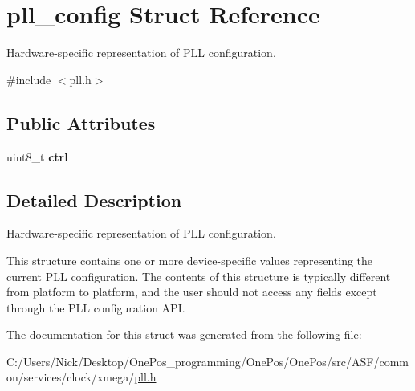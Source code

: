 \hypertarget{structpll__config}{\section{pll\-\_\-config Struct Reference}
\label{structpll__config}
}


Hardware-\/specific representation of P\-L\-L configuration.  




{\ttfamily \#include $<$pll.\-h$>$}

\subsection*{Public Attributes}
\begin{DoxyCompactItemize}
\item 
\hypertarget{structpll__config_a3fda0884562a8a2aa6056c0530b0a401}{uint8\-\_\-t {\bfseries ctrl}}\label{structpll__config_a3fda0884562a8a2aa6056c0530b0a401}

\end{DoxyCompactItemize}


\subsection{Detailed Description}
Hardware-\/specific representation of P\-L\-L configuration. 

This structure contains one or more device-\/specific values representing the current P\-L\-L configuration. The contents of this structure is typically different from platform to platform, and the user should not access any fields except through the P\-L\-L configuration A\-P\-I. 

The documentation for this struct was generated from the following file\-:\begin{DoxyCompactItemize}
\item 
C\-:/\-Users/\-Nick/\-Desktop/\-One\-Pos\-\_\-programming/\-One\-Pos/\-One\-Pos/src/\-A\-S\-F/common/services/clock/xmega/\hyperlink{xmega_2pll_8h}{pll.\-h}\end{DoxyCompactItemize}
